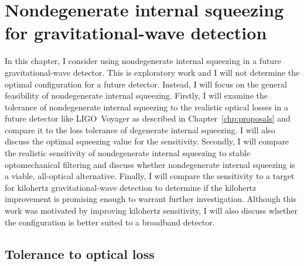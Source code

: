 \chapter{Nondegenerate internal squeezing for gravitational-wave detection}
\label{chp:science_case}


In this chapter, I consider using nondegenerate internal squeezing in a future gravitational-wave detector. This is exploratory work and I will not determine the optimal configuration for a future detector. Instead, I will focus on the general feasibility of nondegenerate internal squeezing. %
Firstly, I will examine the tolerance of nondegenerate internal squeezing to the realistic optical losses in a future detector like LIGO~Voyager as described in Chapter~\ref{chp:proposals} and compare it to the loss tolerance of degenerate internal squeezing. I will also discuss the optimal squeezing value for the sensitivity. Secondly, I will compare the realistic sensitivity of nondegenerate internal squeezing to stable optomechanical filtering and discuss whether nondegenerate internal squeezing is a viable, all-optical alternative. Finally, I will compare the sensitivity to a target for kilohertz gravitational-wave detection to determine if the kilohertz improvement is promising enough to warrant further investigation. Although this work was motivated by improving kilohertz sensitivity, I will also discuss whether the configuration is better suited to a broadband detector. %

\section{Tolerance to optical loss}
\label{sec:nIS_tolerance_to_losses}

